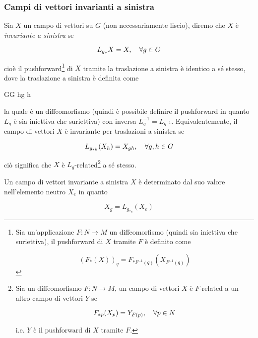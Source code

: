 \subsubsection{Campi di vettori invarianti a sinistra}

Sia $ X $ un campo di vettori su $ G $ (non necessariamente liscio), diremo che $ X $ è \textit{invariante a sinistra} se

\begin{equation}
	L_{g_{*}} X = X \qcomma \forall g \in G
\end{equation}

cioè il pushforward\footnote{%
	Sia un'applicazione $ F : N \to M $ un diffeomorfismo (quindi sia iniettiva che suriettiva), il pushforward di $ X $ tramite $ F $ è definito come

	\begin{equation*}
		(F_{*} (X))_{q} = F_{*F^{-1}(q)} (X_{F^{-1}(q)})
	\end{equation*}%
} di $ X $ tramite la traslazione a sinistra è identico a sé stesso, dove la traslazione a sinistra è definita come

%
	{G}{G}%
	{h}{g h}

la quale è un diffeomorfismo (quindi è possibile definire il pushforward in quanto $ L_{g} $ è sia iniettiva che suriettiva) con inversa $ L_{g}^{-1} = L_{g^{-1}} $. Equivalentemente, il campo di vettori $ X $ è invariante per traslazioni a sinistra se

\begin{equation}
	L_{g_{*h}} (X_{h}) = X_{gh} \qcomma \forall g,h \in G
\end{equation}

ciò significa che $ X $ è $ L_{g} $-related\footnote{%
	Sia un diffeomorfismo $ F : N \to M $, un campo di vettori $ X $ è $ F $-related a un altro campo di vettori $ Y $ se
	
	\begin{equation*}
		F_{*p}(X_{p}) = Y_{F(p)} \qcomma \forall p \in N
	\end{equation*}

	i.e. $ Y $ è il pushforward di $ X $ tramite $ F $.%
} a sé stesso.

\begin{remark}
	Un campo di vettori invariante a sinistra $ X $ è determinato dal suo valore nell'elemento neutro $ X_{e} $ in quanto
	
	\begin{equation}
		X_{g} = L_{g_{*e}} (X_{e})
	\end{equation}
\end{remark}

